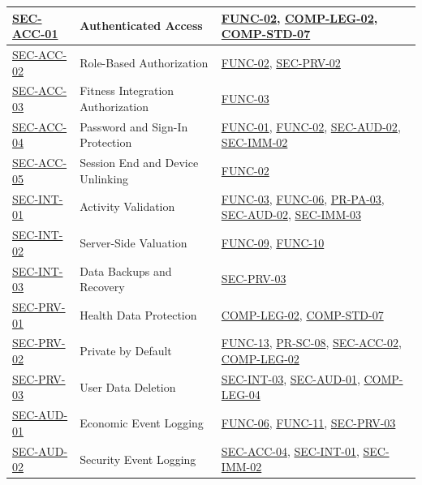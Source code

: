 \documentclass[12pt]{article}
\begin{document}
\begin{xltabular}{\textwidth}{|p{2.3cm}|p{4.2cm}|X|}
\hline
\hyperlink{req:SEC-ACC-01}{SEC-ACC-01} & Authenticated Access & \hyperlink{req:FUNC-02}{FUNC-02}, \hyperlink{req:COMP-LEG-02}{COMP-LEG-02}, \hyperlink{req:COMP-STD-07}{COMP-STD-07} \\
\hline
\hyperlink{req:SEC-ACC-02}{SEC-ACC-02} & Role-Based Authorization & \hyperlink{req:FUNC-02}{FUNC-02}, \hyperlink{req:SEC-PRV-02}{SEC-PRV-02} \\
\hline
\hyperlink{req:SEC-ACC-03}{SEC-ACC-03} & Fitness Integration Authorization & \hyperlink{req:FUNC-03}{FUNC-03} \\
\hline
\hyperlink{req:SEC-ACC-04}{SEC-ACC-04} & Password and Sign-In Protection & \hyperlink{req:FUNC-01}{FUNC-01}, \hyperlink{req:FUNC-02}{FUNC-02}, \hyperlink{req:SEC-AUD-02}{SEC-AUD-02}, \hyperlink{req:SEC-IMM-02}{SEC-IMM-02} \\
\hline
\hyperlink{req:SEC-ACC-05}{SEC-ACC-05} & Session End and Device Unlinking & \hyperlink{req:FUNC-02}{FUNC-02} \\
\hline
\hyperlink{req:SEC-INT-01}{SEC-INT-01} & Activity Validation & \hyperlink{req:FUNC-03}{FUNC-03}, \hyperlink{req:FUNC-06}{FUNC-06}, \hyperlink{req:PR-PA-03}{PR-PA-03}, \hyperlink{req:SEC-AUD-02}{SEC-AUD-02}, \hyperlink{req:SEC-IMM-03}{SEC-IMM-03} \\
\hline
\hyperlink{req:SEC-INT-02}{SEC-INT-02} & Server-Side Valuation & \hyperlink{req:FUNC-09}{FUNC-09}, \hyperlink{req:FUNC-10}{FUNC-10} \\
\hline
\hyperlink{req:SEC-INT-03}{SEC-INT-03} & Data Backups and Recovery & \hyperlink{req:SEC-PRV-03}{SEC-PRV-03} \\
\hline
\hyperlink{req:SEC-PRV-01}{SEC-PRV-01} & Health Data Protection & \hyperlink{req:COMP-LEG-02}{COMP-LEG-02}, \hyperlink{req:COMP-STD-07}{COMP-STD-07} \\
\hline
\hyperlink{req:SEC-PRV-02}{SEC-PRV-02} & Private by Default & \hyperlink{req:FUNC-13}{FUNC-13}, \hyperlink{req:PR-SC-08}{PR-SC-08}, \hyperlink{req:SEC-ACC-02}{SEC-ACC-02}, \hyperlink{req:COMP-LEG-02}{COMP-LEG-02} \\
\hline
\hyperlink{req:SEC-PRV-03}{SEC-PRV-03} & User Data Deletion & \hyperlink{req:SEC-INT-03}{SEC-INT-03}, \hyperlink{req:SEC-AUD-01}{SEC-AUD-01}, \hyperlink{req:COMP-LEG-04}{COMP-LEG-04} \\
\hline
\hyperlink{req:SEC-AUD-01}{SEC-AUD-01} & Economic Event Logging & \hyperlink{req:FUNC-06}{FUNC-06}, \hyperlink{req:FUNC-11}{FUNC-11}, \hyperlink{req:SEC-PRV-03}{SEC-PRV-03} \\
\hline
\hyperlink{req:SEC-AUD-02}{SEC-AUD-02} & Security Event Logging & \hyperlink{req:SEC-ACC-04}{SEC-ACC-04}, \hyperlink{req:SEC-INT-01}{SEC-INT-01}, \hyperlink{req:SEC-IMM-02}{SEC-IMM-02} \\

\end{xltabular}
\end{document}

